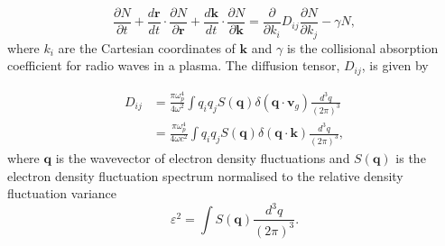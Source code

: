 \begin{equation}
\label{eq:scattering_Fokker_Planck}
\frac{\partial N}{\partial t} +\frac{d \mathbf{r}}{dt} \cdot \frac{\partial N}{\partial \mathbf{r}} + \frac{d \mathbf{k}}{dt} \cdot \frac{\partial N}{\partial \mathbf{k}} = \frac{\partial}{\partial k_i} D_{ij} \frac{\partial N}{\partial k_j} - \gamma N,
\end{equation}
where $k_i$ are the Cartesian coordinates of $\mathbf{k}$ and $\gamma$ is the collisional absorption coefficient for radio waves in a plasma. The diffusion tensor, $D_{ij}$, is given by

\begin{equation}
\label{eq:scattering_diffusion_tensor}
\begin{aligned}
D_{ij} &= \frac{\pi \omega_p^4}{4 \omega^2} \int q_i q_j S(\mathbf{q}) \delta(\mathbf{q} \cdot \mathbf{v}_g) \frac{d^3 q}{(2 \pi)^3} \\
&= \frac{\pi \omega_p^4}{4 \omega c^2} \int q_i q_j S(\mathbf{q}) \delta(\mathbf{q} \cdot \mathbf{k}) \frac{d^3 q}{(2 \pi)^3},
\end{aligned}
\end{equation}
where $\mathbf{q}$ is the wavevector of electron density fluctuations and $S(\mathbf{q})$ is the electron density fluctuation spectrum normalised to the relative density fluctuation variance
\begin{equation}
\varepsilon^2 = \int S(\mathbf{q})  \frac{d^3 q}{(2 \pi)^3}.
\end{equation}

